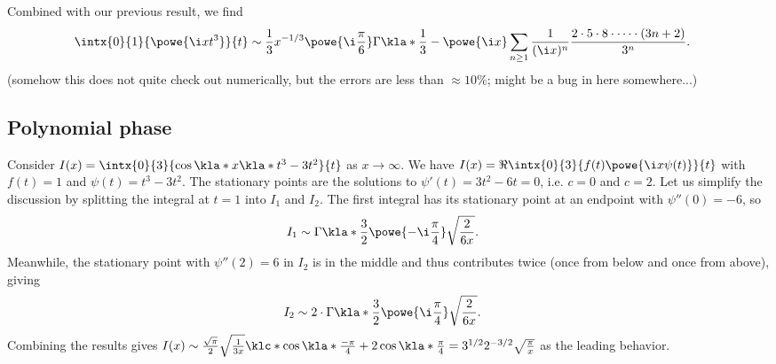 \documentclass[english, parskip=full]{scrartcl}
\begin{document}
Combined with our previous result, we find
\begin{align}
\intx{0}{1}{\powe{\i xt^3}}{t} &\sim \frac{1}{3}x^{-1/3} \powe{\i \frac{\pi}{6}} \Gamma\kla*{\frac{1}{3}} - \powe{\i x} \sum_{n\ge 1} \frac{1}{(\i x)^{n}} \frac{2\cdot 5 \cdot 8 \cdot \dots \cdot (3n+2)}{3^{n}}.
\end{align}
(somehow this does not quite check out numerically, but the errors are less than $\approx 10\%$; might be a bug in here somewhere...)
\subsection{Polynomial phase}
Consider $I(x) = \intx{0}{3}{\cos\kla*{x\kla*{t^3-3t^2}}}{t}$ as $x\rightarrow\infty$.
We have $I(x) = \Re \intx{0}{3}{f(t)\powe{\i x\psi(t)}}{t}$ with $f(t)=1$ and $\psi(t) = t^3-3t^2$.
The stationary points are the solutions to $\psi'(t)=3t^2-6t=0$, i.e. $c=0$ and $c=2$.
Let us simplify the discussion by splitting the integral at $t=1$ into $I_1$ and $I_2$.
The first integral has its stationary point at an endpoint with $\psi''(0)=-6$, so
\begin{align}
I_1&\sim \Gamma\kla*{\frac{3}{2}} \powe{-\i \frac{\pi}{4}} \sqrt{\frac{2}{6x}}.
\end{align}
Meanwhile, the stationary point with $\psi''(2)=6$ in $I_2$ is in the middle and thus contributes twice (once from below and once from above), giving
\begin{align}
I_2&\sim 2\cdot \Gamma\kla*{\frac{3}{2}} \powe{\i \frac{\pi}{4}} \sqrt{\frac{2}{6x}}.
\end{align}
Combining the results gives $I(x) \sim \frac{\sqrt{\pi}}{2} \sqrt{\frac{1}{3x}} \klc*{\cos\kla*{\frac{-\pi}{4}} + 2\cos\kla*{\frac{\pi}{4}}} = 3^{1/2} 2^{-3/2} \sqrt{\frac{\pi}{x}}$ as the leading behavior.
\end{document}
